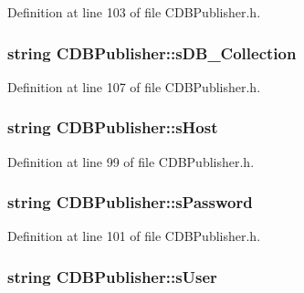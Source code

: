 \-Definition at line 103 of file \-C\-D\-B\-Publisher.\-h.

\hypertarget{class_c_d_b_publisher_a10c344b92ca8af51800352cdb99c47c6}{
\subsubsection[{s\-D\-B\-\_\-\-Collection}]{\setlength{\rightskip}{0pt plus 5cm}string {\bf \-C\-D\-B\-Publisher\-::s\-D\-B\-\_\-\-Collection}}}\label{class_c_d_b_publisher_a10c344b92ca8af51800352cdb99c47c6}


\-Definition at line 107 of file \-C\-D\-B\-Publisher.\-h.

\hypertarget{class_c_d_b_publisher_ab5978dae8e2b51382c7b754b00eb6f37}{
\subsubsection[{s\-Host}]{\setlength{\rightskip}{0pt plus 5cm}string {\bf \-C\-D\-B\-Publisher\-::s\-Host}}}\label{class_c_d_b_publisher_ab5978dae8e2b51382c7b754b00eb6f37}


\-Definition at line 99 of file \-C\-D\-B\-Publisher.\-h.

\hypertarget{class_c_d_b_publisher_af7857687fa866673f59598535a191139}{
\subsubsection[{s\-Password}]{\setlength{\rightskip}{0pt plus 5cm}string {\bf \-C\-D\-B\-Publisher\-::s\-Password}}}\label{class_c_d_b_publisher_af7857687fa866673f59598535a191139}


\-Definition at line 101 of file \-C\-D\-B\-Publisher.\-h.

\hypertarget{class_c_d_b_publisher_a70c6a70a3eac533267cd6c09d7e4cfe4}{
\subsubsection[{s\-User}]{\setlength{\rightskip}{0pt plus 5cm}string {\bf \-C\-D\-B\-Publisher\-::s\-User}}}\label{class_c_d_b_publisher_a70c6a70a3eac533267cd6c09d7e4cfe4}


